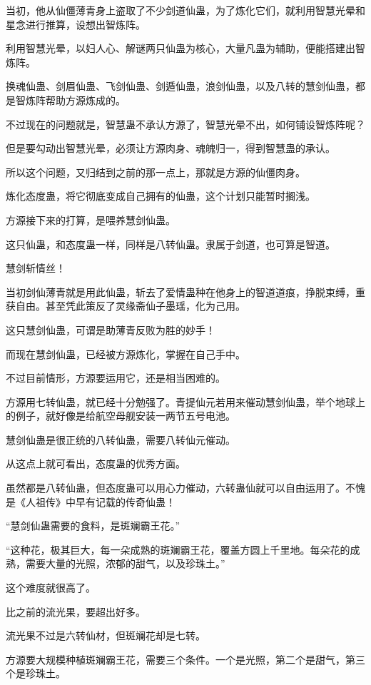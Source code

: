 \begin{this_body}
当初，他从仙僵薄青身上盗取了不少剑道仙蛊，为了炼化它们，就利用智慧光晕和星念进行推算，设想出智炼阵。

利用智慧光晕，以妇人心、解谜两只仙蛊为核心，大量凡蛊为辅助，便能搭建出智炼阵。

换魂仙蛊、剑眉仙蛊、飞剑仙蛊、剑遁仙蛊，浪剑仙蛊，以及八转的慧剑仙蛊，都是智炼阵帮助方源炼成的。

不过现在的问题就是，智慧蛊不承认方源了，智慧光晕不出，如何铺设智炼阵呢？

但是要勾动出智慧光晕，必须让方源肉身、魂魄归一，得到智慧蛊的承认。

所以这个问题，又归结到之前的那一点上，那就是方源的仙僵肉身。

炼化态度蛊，将它彻底变成自己拥有的仙蛊，这个计划只能暂时搁浅。

方源接下来的打算，是喂养慧剑仙蛊。

这只仙蛊，和态度蛊一样，同样是八转仙蛊。隶属于剑道，也可算是智道。

慧剑斩情丝！

当初剑仙薄青就是用此仙蛊，斩去了爱情蛊种在他身上的智道道痕，挣脱束缚，重获自由。甚至凭此策反了灵缘斋仙子墨瑶，化为己用。

这只慧剑仙蛊，可谓是助薄青反败为胜的妙手！

而现在慧剑仙蛊，已经被方源炼化，掌握在自己手中。

不过目前情形，方源要运用它，还是相当困难的。

方源用七转仙蛊，就已经十分勉强了。青提仙元若用来催动慧剑仙蛊，举个地球上的例子，就好像是给航空母舰安装一两节五号电池。

慧剑仙蛊是很正统的八转仙蛊，需要八转仙元催动。

从这点上就可看出，态度蛊的优秀方面。

虽然都是八转仙蛊，但态度蛊可以用心力催动，六转蛊仙就可以自由运用了。不愧是《人祖传》中早有记载的传奇仙蛊！

“慧剑仙蛊需要的食料，是斑斓霸王花。”

“这种花，极其巨大，每一朵成熟的斑斓霸王花，覆盖方圆上千里地。每朵花的成熟，需要大量的光照，浓郁的甜气，以及珍珠土。”

这个难度就很高了。

比之前的流光果，要超出好多。

流光果不过是六转仙材，但斑斓花却是七转。

方源要大规模种植斑斓霸王花，需要三个条件。一个是光照，第二个是甜气，第三个是珍珠土。


\end{this_body}
